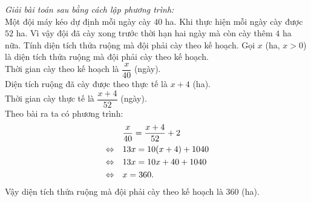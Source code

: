 \begin{ex}%
\textit{Giải bài toán sau bằng cách lập phương trình:}\\
Một đội máy kéo dự định mỗi ngày cày $40$ ha. Khi thực hiện mỗi ngày cày được $52$ ha. Vì vậy đội đã cày xong trước thời hạn hai ngày mà còn cày thêm $4$ ha nữa. Tính diện tích thửa ruộng mà đội phải cày theo kế hoạch.
\loigiai
    {
    	Gọi $x$ (ha, $x > 0$) là diện tích thửa ruộng mà đội phải cày theo kế hoạch.\\
    	Thời gian cày theo kế hoạch là $\dfrac{x}{40}$ (ngày).\\
    	Diện tích ruộng đã cày được theo thực tế là $x + 4$ (ha).\\
    	Thời gian cày thực tế là $\dfrac{x+4}{52}$ (ngày).\\
    	Theo bài ra ta có phương trình:
    		$$
        		\begin{aligned}
        		&\quad \dfrac{x}{40} = \dfrac{x+4}{52} + 2\\
        		\Leftrightarrow &\quad 13x = 10(x+4) + 1040\\
        		\Leftrightarrow &\quad 13x = 10x + 40 + 1040\\
        		\Leftrightarrow &\quad x = 360.
        		\end{aligned}\\
        	$$
        Vậy diện tích thửa ruộng mà đội phải cày theo kế hoạch là $360$ (ha).
    }
\end{ex}

